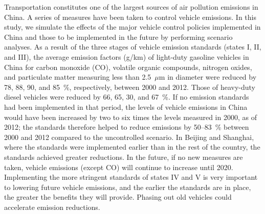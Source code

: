 Transportation constitutes one of the largest sources of air pollution emissions in China. A series of measures have been taken to control vehicle emissions. In this study, we simulate the effects of the major vehicle control policies implemented in China and those to be implemented in the future by performing scenario analyses. As a result of the three stages of vehicle emission standards (states I, II, and III), the average emission factors (g/km) of light-duty gasoline vehicles in China for carbon monoxide (CO), volatile organic compounds, nitrogen oxides, and particulate matter measuring less than 2.5 $\mu$m in diameter were reduced by 78, 88, 90, and 85 {\%}, respectively, between 2000 and 2012. Those of heavy-duty diesel vehicles were reduced by 66, 65, 30, and 67 {\%}. If no emission standards had been implemented in that period, the levels of vehicle emissions in China would have been increased by two to six times the levels measured in 2000, as of 2012; the standards therefore helped to reduce emissions by 50--83 {\%} between 2000 and 2012 compared to the uncontrolled scenario. In Beijing and Shanghai, where the standards were implemented earlier than in the rest of the country, the standards achieved greater reductions. In the future, if no new measures are taken, vehicle emissions (except CO) will continue to increase until 2020. Implementing the more stringent standards of states IV and V is very important to lowering future vehicle emissions, and the earlier the standards are in place, the greater the benefits they will provide. Phasing out old vehicles could accelerate emission reductions.